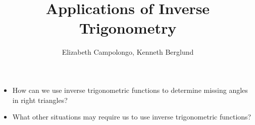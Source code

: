 \documentclass{ximera}
\author{Elizabeth Campolongo, Kenneth Berglund}
\title{Applications of Inverse Trigonometry}
\begin{document}
\begin{abstract}
  
\end{abstract}
\maketitle



\begin{motivatingQuestions}\begin{itemize}
\item How can we use inverse trigonometric functions to determine missing angles in right triangles?
\item What other situations may require us to use inverse trigonometric functions?
\end{itemize}\end{motivatingQuestions}


\end{document}
